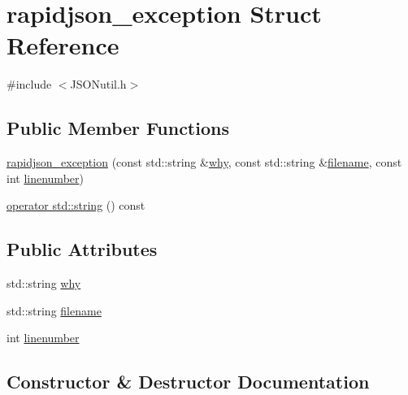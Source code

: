 \hypertarget{structrapidjson__exception}{}\section{rapidjson\+\_\+exception Struct Reference}
\label{structrapidjson__exception}


{\ttfamily \#include $<$J\+S\+O\+Nutil.\+h$>$}

\subsection*{Public Member Functions}
\begin{DoxyCompactItemize}
\item 
\hyperlink{structrapidjson__exception_ac81e815ea43f0364ebc365ad299584b9}{rapidjson\+\_\+exception} (const std\+::string \&\hyperlink{structrapidjson__exception_a6b432b89bd7052332bc923f274249e1e}{why}, const std\+::string \&\hyperlink{structrapidjson__exception_a56bc0e220fc6c7037e877f9f2e3f99f0}{filename}, const int \hyperlink{structrapidjson__exception_a9c0263f853d8a17911e29cae66708e67}{linenumber})
\item 
\hyperlink{structrapidjson__exception_afd42d8ce38804d2951ab8cd328cbd9e1}{operator std\+::string} () const
\end{DoxyCompactItemize}
\subsection*{Public Attributes}
\begin{DoxyCompactItemize}
\item 
std\+::string \hyperlink{structrapidjson__exception_a6b432b89bd7052332bc923f274249e1e}{why}
\item 
std\+::string \hyperlink{structrapidjson__exception_a56bc0e220fc6c7037e877f9f2e3f99f0}{filename}
\item 
int \hyperlink{structrapidjson__exception_a9c0263f853d8a17911e29cae66708e67}{linenumber}
\end{DoxyCompactItemize}


\subsection{Constructor \& Destructor Documentation}
\mbox{\label{structrapidjson__exception_ac81e815ea43f0364ebc365ad299584b9}} 
